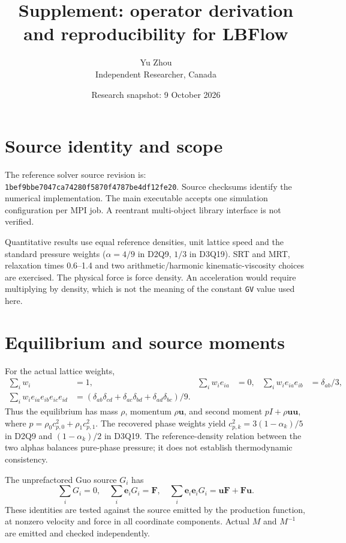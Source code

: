 \documentclass[11pt]{article}
\title{Supplement: operator derivation and reproducibility for LBFlow}
\author{Yu Zhou\\Independent Researcher, Canada}
\date{Research snapshot: 9 October 2026}
\begin{document}
\maketitle
\section{Source identity and scope}
The reference solver source revision is:\\
\texttt{1bef9bbe7047ca74280f5870f4787be4df12fe20}.
Source checksums identify the numerical implementation. The main executable accepts one simulation configuration per MPI
job. A reentrant multi-object library interface is not verified.

Quantitative results use equal reference densities, unit lattice speed and
the standard pressure weights ($\alpha=4/9$ in D2Q9, $1/3$ in D3Q19).
SRT and MRT, relaxation times 0.6--1.4 and two arithmetic/harmonic
kinematic-viscosity choices are exercised. The physical force is force
density. An acceleration would require multiplying by density, which is not
the meaning of the constant \texttt{GV} value used here.







\section{Equilibrium and source moments}
For the actual lattice weights,
\begin{align}
 \sum_iw_i&=1,&\sum_iw_i e_{ia}&=0,&\sum_iw_i e_{ia}e_{ib}&=\delta_{ab}/3,\\
 \sum_iw_i e_{ia}e_{ib}e_{ic}e_{id}
 &= (\delta_{ab}\delta_{cd}+\delta_{ac}\delta_{bd}+\delta_{ad}\delta_{bc})/9.
\end{align}
Thus the equilibrium has mass $\rho$, momentum $\rho\bm u$, and second moment
$pI+\rho\bm u\bm u$, where
$p=\rho_0c_{p,0}^2+\rho_1c_{p,1}^2$.
The recovered phase weights yield
$c_{p,k}^2=3(1-\alpha_k)/5$ in D2Q9 and $(1-\alpha_k)/2$ in D3Q19.
The reference-density relation between the two alphas balances pure-phase
pressure; it does not establish thermodynamic consistency.

The unprefactored Guo source $G_i$ has
\begin{equation}
 \sum_iG_i=0,\quad \sum_i\bm e_iG_i=\bm F,\quad
 \sum_i\bm e_i\bm e_iG_i=\bm u\bm F+\bm F\bm u.
\end{equation}
These identities are tested against the source emitted by the production
function, at nonzero velocity and force in all coordinate components.
Actual $M$ and $M^{-1}$ are emitted and checked independently.
\end{document}
